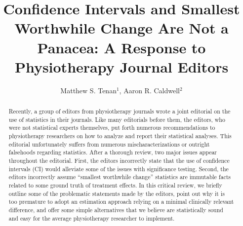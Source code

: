 \documentclass[]{cik}%
\begin{document}
\captionsetup[table]{labelformat=empty}
\captionsetup[figure]{labelformat=empty}
\raggedbottom

\title{Confidence Intervals and Smallest Worthwhile Change Are Not a
Panacea: A Response to Physiotherapy Journal Editors}

\author{
Matthew S. Tenan$^{1}$,
Aaron R. Caldwell$^{2}$}

\address{
  $^{1}$Rockefeller Neuroscience Institute, West Virginia University,
Morgantown, WV, USA\\
  $^{2}$Natick, MA, USA}
\subject{
}


\inserttype{
{\Large }
}




\begin{abstract}
Recently, a group of editors from physiotherapy journals wrote a joint
editorial on the use of statistics in their journals. Like many
editorials before them, the editors, who were not statistical experts
themselves, put forth numerous recommendations to physiotherapy
researchers on how to analyze and report their statistical analyses.
This editorial unfortunately suffers from numerous mischaracterizations
or outright falsehoods regarding statistics. After a thorough review,
two major issues appear throughout the editorial. First, the editors
incorrectly state that the use of confidence intervals (CI) would
alleviate some of the issues with significance testing. Second, the
editors incorrectly assume ``smallest worthwhile change'' statistics are
immutable facts related to some ground truth of treatment effects. In
this critical review, we briefly outline some of the problematic
statements made by the editors, point out why it is too premature to
adopt an estimation approach relying on a minimal clinically relevant
difference, and offer some simple alternatives that we believe are
statistically sound and easy for the average physiotherapy researcher to
implement.
\end{abstract}
\end{document}
